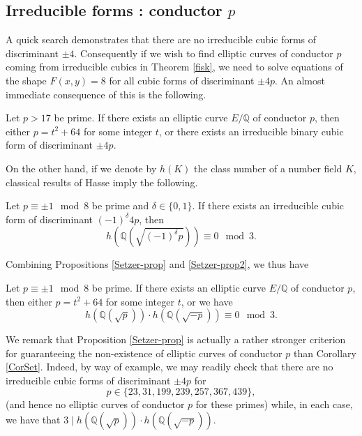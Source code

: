 \subsection{Irreducible forms : conductor $p$}
A quick search demonstrates that there are no irreducible cubic forms of discriminant $\pm 4$. Consequently if we wish 
to find  elliptic curves of conductor $p$ coming from irreducible cubics in Theorem \ref{fisk}, we need to solve equations of the shape 
$F(x,y)=8$ for all cubic forms of discriminant $\pm 4p$. An almost immediate consequence of this is the following.
\begin{proposition} \label{Setzer-prop}
Let $p > 17$ be prime. If there exists an elliptic curve $E/\mathbb{Q}$ of conductor $p$, then either $p=t^2+64$ for some integer $t$, or there exists an irreducible binary cubic form of discriminant $\pm 4p$.
\end{proposition}

On the other hand, if we denote by $h(K)$  the class number of a number field $K$, classical results of Hasse \cite{Has} imply the following.

\begin{proposition} \label{Setzer-prop2}
Let $p \equiv \pm 1 \mod{8}$ be prime and $\delta \in \{ 0, 1 \}$. If there exists an irreducible cubic form of discriminant $(-1)^\delta 4 p$, then 
$$
h \left( \mathbb{Q} (\sqrt{(-1)^\delta p}) \right) \equiv 0 \mod{3}.
$$
\end{proposition}

Combining Propositions \ref{Setzer-prop} and \ref{Setzer-prop2}, we thus have
\begin{corollary} \label{CorSet}
Let $p \equiv \pm 1 \mod{8}$ be prime. If there exists an elliptic curve $E/\mathbb{Q}$ of conductor $p$, then either $p=t^2+64$ for some integer $t$, or we have
$$
h \left( \mathbb{Q} (\sqrt{p}) \right) \cdot h \left( \mathbb{Q} (\sqrt{-p}) \right) \equiv 0 \mod{3}.
$$
\end{corollary}

We remark that Proposition \ref{Setzer-prop} is actually a rather stronger criterion for guaranteeing the non-existence of elliptic curves of conductor $p$ than Corollary \ref{CorSet}. Indeed, by way of example, we may readily check that there are no irreducible cubic forms of discriminant $\pm 4p$ for 
$$
p \in \{ 23, 31, 199, 239, 257, 367, 439 \},
$$
(and hence no elliptic curves of conductor $p$ for these primes)
while, in each case, we have that
$ 3 \mid h \left( \mathbb{Q} (\sqrt{p}) \right) \cdot h \left( \mathbb{Q} (\sqrt{-p}) \right)$.

